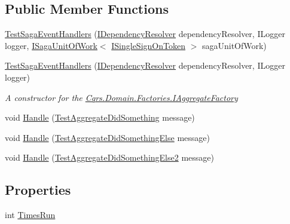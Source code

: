 \subsection*{Public Member Functions}
\begin{DoxyCompactItemize}
\item 
\hyperlink{classCqrs_1_1Tests_1_1Substitutes_1_1TestSagaEventHandlers_a3e06754c734bf0d7a3c18a97ce68497a_a3e06754c734bf0d7a3c18a97ce68497a}{Test\+Saga\+Event\+Handlers} (\hyperlink{interfaceCqrs_1_1Configuration_1_1IDependencyResolver}{I\+Dependency\+Resolver} dependency\+Resolver, I\+Logger logger, \hyperlink{interfaceCqrs_1_1Domain_1_1ISagaUnitOfWork}{I\+Saga\+Unit\+Of\+Work}$<$ \hyperlink{interfaceCqrs_1_1Authentication_1_1ISingleSignOnToken}{I\+Single\+Sign\+On\+Token} $>$ saga\+Unit\+Of\+Work)
\item 
\hyperlink{classCqrs_1_1Tests_1_1Substitutes_1_1TestSagaEventHandlers_a3bf5ebcf037900b52a1d33e7b848f770_a3bf5ebcf037900b52a1d33e7b848f770}{Test\+Saga\+Event\+Handlers} (\hyperlink{interfaceCqrs_1_1Configuration_1_1IDependencyResolver}{I\+Dependency\+Resolver} dependency\+Resolver, I\+Logger logger)
\begin{DoxyCompactList}\small\item\em A constructor for the \hyperlink{interfaceCqrs_1_1Domain_1_1Factories_1_1IAggregateFactory}{Cqrs.\+Domain.\+Factories.\+I\+Aggregate\+Factory} \end{DoxyCompactList}\item 
void \hyperlink{classCqrs_1_1Tests_1_1Substitutes_1_1TestSagaEventHandlers_a6160e0aacb592f32da125c2e22e64fe4_a6160e0aacb592f32da125c2e22e64fe4}{Handle} (\hyperlink{classCqrs_1_1Tests_1_1Substitutes_1_1TestAggregateDidSomething}{Test\+Aggregate\+Did\+Something} message)
\item 
void \hyperlink{classCqrs_1_1Tests_1_1Substitutes_1_1TestSagaEventHandlers_acc569a13706ab279219cc0986ed9b9d2_acc569a13706ab279219cc0986ed9b9d2}{Handle} (\hyperlink{classCqrs_1_1Tests_1_1Substitutes_1_1TestAggregateDidSomethingElse}{Test\+Aggregate\+Did\+Something\+Else} message)
\item 
void \hyperlink{classCqrs_1_1Tests_1_1Substitutes_1_1TestSagaEventHandlers_aec2d678e12381f49a05185f359db5bd6_aec2d678e12381f49a05185f359db5bd6}{Handle} (\hyperlink{classCqrs_1_1Tests_1_1Substitutes_1_1TestAggregateDidSomethingElse2}{Test\+Aggregate\+Did\+Something\+Else2} message)
\end{DoxyCompactItemize}
\subsection*{Properties}
\begin{DoxyCompactItemize}
\item 
int \hyperlink{classCqrs_1_1Tests_1_1Substitutes_1_1TestSagaEventHandlers_aa9ddc3c7e90f6f23bdc1906fae2c0339_aa9ddc3c7e90f6f23bdc1906fae2c0339}{Times\+Run}
\end{DoxyCompactItemize}

